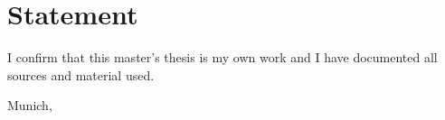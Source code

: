 \chapter*{Statement}
I confirm that this master's thesis is my own work and I have documented all sources and material used.

\vspace{4\baselineskip}

\makeatletter
Munich, \@date
\makeatother
